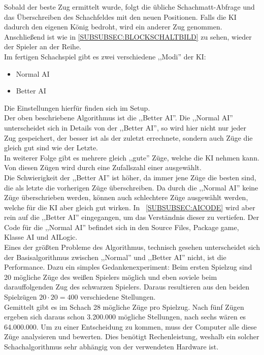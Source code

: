 \documentclass[12pt,a4paper]{article}
\begin{document}
Sobald der beste Zug ermittelt wurde, folgt die übliche Schachmatt-Abfrage und das Überschreiben des Schachfeldes mit den neuen Positionen. Falls die KI dadurch den eigenen König bedroht, wird ein anderer Zug genommen. Anschließend ist wie in \ref{SUBSUBSEC:BLOCKSCHALTBILD} zu sehen, wieder der Spieler an der Reihe. \\[2ex]
Im fertigen Schachspiel gibt es zwei verschiedene ,,Modi'' der KI:
\begin{itemize}
	\item{Normal AI}
	\item{Better AI}
\end{itemize}
Die Einstellungen hierfür finden sich im Setup.\\
Der oben beschriebene Algorithmus ist die ,,Better AI''. Die ,,Normal AI'' unterscheidet sich in Details von der ,,Better AI'', so wird hier nicht nur jeder Zug gespeichert, der besser ist als der zuletzt errechnete, sondern auch Züge die gleich gut sind wie der Letzte. \\
In weiterer Folge gibt es mehrere gleich ,,gute'' Züge, welche die KI nehmen kann. Von diesen Zügen wird durch eine Zufallszahl einer ausgewählt. \\
Die Schwierigkeit der ,,Better AI'' ist höher, da immer jene Züge die besten sind, die als letzte die vorherigen Züge überschreiben. Da durch die ,,Normal AI'' keine Züge überschrieben werden, können auch schlechtere Züge ausgewählt werden, welche für die KI aber gleich gut wirken. In ~\ref{SUBSUBSEC:AICODE} wird aber rein auf die ,,Better AI'' eingegangen, um das Verständnis dieser zu vertiefen. Der Code für die ,,Normal AI'' befindet sich in den Source Files, Package game, Klasse AI und AILogic. \\[2ex]
Eines der größten Probleme des Algorithmus, technisch gesehen unterscheidet sich der Basisalgorithmus zwischen ,,Normal'' und ,,Better AI'' nicht, ist die Performance. Dazu ein simples Gedankenexperiment: Beim ersten Spielzug sind 20 mögliche Züge des weißen Spielers möglich und eben soviele beim darauffolgenden Zug des schwarzen Spielers. Daraus resultieren aus den beiden Spielzügen \(20 \cdot 20 = 400\) verschiedene Stellungen. \\
Gemittelt gibt es im Schach 28 mögliche Züge pro Spielzug. Nach fünf Zügen ergeben sich daraus schon 3.200.000 mögliche Stellungen, nach sechs wären es 64.000.000. Um zu einer Entscheidung zu kommen, muss der Computer alle diese Züge analysieren und bewerten. Dies benötigt Rechenleistung, weshalb ein solcher Schachalgorithmus sehr abhängig von der verwendeten Hardware ist. \\[1ex]
\end{document}
